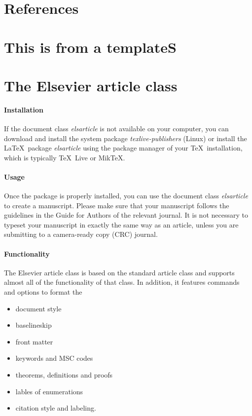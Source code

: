 \documentclass[5p]{elsarticle}
\begin{document}
\section*{References}





\clearpage
\section{This is from a templateS}
\section{The Elsevier article class}

\paragraph{Installation} If the document class \emph{elsarticle} is not available on your computer, you can download and install the system package \emph{texlive-publishers} (Linux) or install the \LaTeX\ package \emph{elsarticle} using the package manager of your \TeX\ installation, which is typically \TeX\ Live or Mik\TeX.

\paragraph{Usage} Once the package is properly installed, you can use the document class \emph{elsarticle} to create a manuscript. Please make sure that your manuscript follows the guidelines in the Guide for Authors of the relevant journal. It is not necessary to typeset your manuscript in exactly the same way as an article, unless you are submitting to a camera-ready copy (CRC) journal.

\paragraph{Functionality} The Elsevier article class is based on the standard article class and supports almost all of the functionality of that class. In addition, it features commands and options to format the
\begin{itemize}
\item document style
\item baselineskip
\item front matter
\item keywords and MSC codes
\item theorems, definitions and proofs
\item lables of enumerations
\item citation style and labeling.
\end{itemize}
\end{document}
